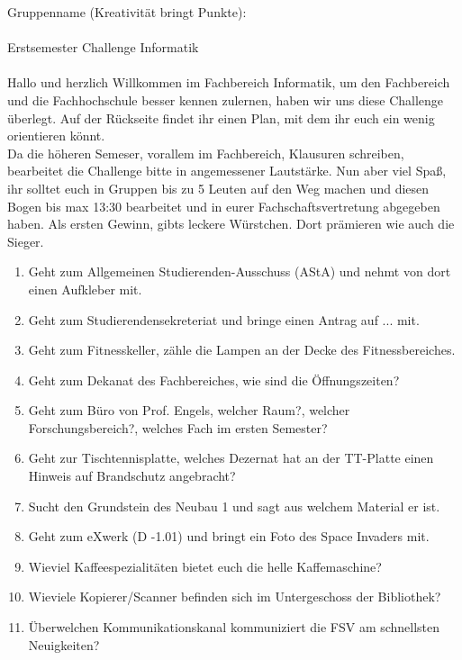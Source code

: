 \documentclass[a4paper,15pt]{scrartcl}
\begin{document}
Gruppenname (Kreativität bringt Punkte):\hrulefill
\\
\\
{\huge Erstsemester Challenge Informatik}
\\
\\

Hallo und herzlich Willkommen im Fachbereich Informatik, um den Fachbereich und die Fachhochschule besser kennen zulernen, haben wir uns diese Challenge überlegt.
Auf der Rückseite findet ihr einen Plan, mit dem ihr euch ein wenig orientieren könnt.\\

Da die höheren Semeser, vorallem im Fachbereich, Klausuren schreiben, bearbeitet die Challenge bitte in angemessener Lautstärke. Nun aber viel Spaß, ihr solltet euch in Gruppen bis zu 5 Leuten auf den Weg machen und diesen Bogen bis max 13:30 bearbeitet und in eurer Fachschaftsvertretung abgegeben haben. Als ersten Gewinn, gibts leckere Würstchen. Dort prämieren wie auch die Sieger.

\begin{enumerate}
	\item Geht zum Allgemeinen Studierenden-Ausschuss (AStA) und nehmt von dort einen Aufkleber mit.
	\item Geht zum Studierendensekreteriat und bringe einen Antrag auf ... mit.
	\item Geht zum Fitnesskeller, zähle die Lampen an der Decke des Fitnessbereiches.
	\item Geht zum Dekanat des Fachbereiches, wie sind die Öffnungszeiten?
	\item Geht zum Büro von Prof. Engels, welcher Raum?, welcher Forschungsbereich?, welches Fach im ersten Semester?
	\item Geht zur Tischtennisplatte, welches Dezernat hat an der TT-Platte einen Hinweis auf Brandschutz angebracht?
	\item Sucht den Grundstein des Neubau 1 und sagt aus welchem Material er ist.
	\item Geht zum eXwerk (D -1.01) und bringt ein Foto des Space Invaders mit.
	\item Wieviel Kaffeespezialitäten bietet euch die helle Kaffemaschine?
	\item Wieviele Kopierer/Scanner befinden sich im Untergeschoss der Bibliothek?
	\item Überwelchen Kommunikationskanal kommuniziert die FSV am schnellsten Neuigkeiten?
\end{enumerate}
\end{document}
